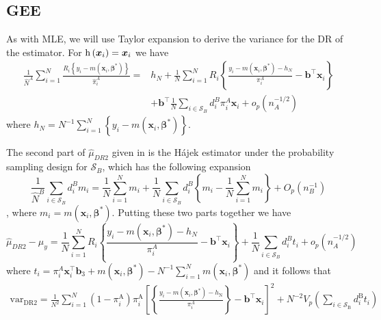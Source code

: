 \documentclass[
  letterpaper,
  DIV=11,
  numbers=noendperiod]{scrreprt}
\begin{document}
\subsection{GEE}\label{gee-1}

As with MLE, we will use Taylor expansion to derive the variance for the
DR of the estimator. For \(\operatorname{h}\left(\boldsymbol{x}_i\right) = \boldsymbol{x}_i\)
we have \[
\begin{aligned}
\frac{1}{\hat{N}^A} \sum_{i=1}^N \frac{R_i\left\{y_i-m\left(\boldsymbol{x}_i, \boldsymbol{\beta}^*\right)\right\}}{\hat{\pi}_i^A}= & h_N+\frac{1}{N} \sum_{i=1}^N R_i\left\{\frac{y_i-m\left(\boldsymbol{x}_i, \boldsymbol{\beta}^*\right)-h_N}{\pi_i^A}-\mathbf{b}^{\top} \boldsymbol{x}_i\right\} \\
& +\mathbf{b}^{\top} \frac{1}{N} \sum_{i \in \mathcal{S}_B} d_i^B \pi_i^A \boldsymbol{x}_i+o_p\left(n_A^{-1 / 2}\right)
\end{aligned}
\] where
\(h_N=N^{-1} \sum_{i=1}^N\left\{y_i-m\left(\boldsymbol{x}_i, \boldsymbol{\beta}^*\right)\right\}\).

The second part of \(\hat{\mu}_{D R 2}\) given in is the Hájek estimator
under the probability sampling design for \(\mathcal{S}_B\), which has
the following expansion \[
\frac{1}{\hat{N}^B} \sum_{i \in \mathcal{S}_B} d_i^B m_i=\frac{1}{N} \sum_{i=1}^N m_i+\frac{1}{N} \sum_{i \in \mathcal{S}_B} d_i^B\left\{m_i-\frac{1}{N} \sum_{i=1}^N m_i\right\}+O_p\left(n_B^{-1}\right)
\], where \(m_i=m\left(\boldsymbol{x}_i, \boldsymbol{\beta}^*\right)\).
Putting these two parts together we have \[
\hat{\mu}_{D R 2}-\mu_y=\frac{1}{N} \sum_{i=1}^N R_i\left\{\frac{y_i-m\left(\boldsymbol{x}_i, \boldsymbol{\beta}^*\right)-h_N}{\pi_i^A}-\mathbf{b}^{\top} \boldsymbol{x}_i\right\}+\frac{1}{N} \sum_{i \in \mathcal{S}_B} d_i^B t_i+o_p\left(n_A^{-1 / 2}\right)
\] where
\(t_i=\pi_i^A \boldsymbol{x}_i^{\top} \mathbf{b}_3+m\left(\boldsymbol{x}_i, \boldsymbol{\beta}^*\right)-N^{-1} \sum_{i=1}^N m\left(\boldsymbol{x}_i, \boldsymbol{\beta}^*\right)\)
and it follows that \[
\begin{gathered}
\text{var}_{\mathrm{DR} 2}=\frac{1}{N^2} \sum_{i=1}^N\left(1-\pi_i^{\mathrm{A}}\right) \pi_i^{\mathrm{A}}\left[\left\{\frac{y_i-m\left(\boldsymbol{x}_i, \boldsymbol{\beta}^*\right)-h_{\mathrm{N}}}{\pi_i^A}\right\} -
\mathbf{b}^{\top} \boldsymbol{x}_i\right]^2 + N^{-2} V_p\left(\sum_{i \in \mathcal{S}_{\mathrm{B}}} d_i^{\mathrm{B}} t_i\right)
\end{gathered}
\]
\end{document}
